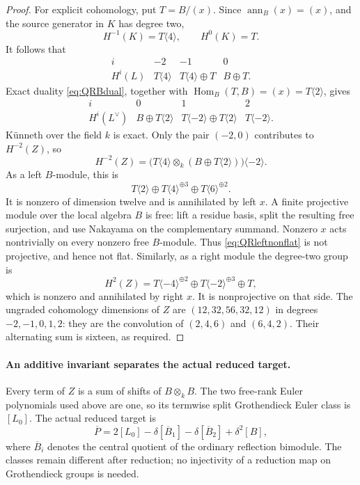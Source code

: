 \documentclass[11pt,a4paper]{article}
\theoremstyle{named}\newtheorem{finding}{Finding}[section]
\theoremstyle{definition}\newtheorem{definition}[finding]{Definition}
\theoremstyle{remark}\newtheorem{remark}[finding]{Remark}
\begin{document}
\begin{proof}
For explicit cohomology, put \(T=B/(x)\).
Since \(\operatorname{ann}_B(x)=(x)\), and the
source generator in \(K\) has degree two,
\[
 H^{-1}(K)=T\langle4\rangle,\qquad H^0(K)=T.
\]
It follows that
\[
\begin{array}{c|ccc}
 i&-2&-1&0\\\hline
 H^i(L)&T\langle4\rangle&
 T\langle4\rangle\oplus T&B\oplus T.
\end{array}
\]
Exact duality \eqref{eq:QRBdual}, together with
\(\operatorname{Hom}_B(T,B)=(x)=T\langle2\rangle\),
gives
\[
\begin{array}{c|ccc}
 i&0&1&2\\\hline
 H^i(L^\vee)&B\oplus T\langle2\rangle&
 T\langle-2\rangle\oplus T\langle2\rangle&
 T\langle-2\rangle.
\end{array}
\]
K\"unneth over the field \(k\) is exact.
Only the pair \((-2,0)\) contributes to
\(H^{-2}(Z)\), so
\[
 H^{-2}(Z)=
 \bigl(T\langle4\rangle\otimes_k
       (B\oplus T\langle2\rangle)\bigr)\langle-2\rangle.
\]
As a left \(B\)-module, this is
\begin{equation}\label{eq:QRleftnonflat}
 T\langle2\rangle\oplus
 T\langle4\rangle^{\oplus3}\oplus
 T\langle6\rangle^{\oplus2}.
\end{equation}
It is nonzero of dimension twelve and is annihilated
by left \(x\). A finite projective module over the
local algebra \(B\) is free: lift a residue basis,
split the resulting free surjection, and use
Nakayama on the complementary summand.
Nonzero \(x\) acts nontrivially on every nonzero
free \(B\)-module. Thus \eqref{eq:QRleftnonflat}
is not projective, and hence not flat.
Similarly, as a right module the degree-two group is
\begin{equation}\label{eq:QRrightnonflat}
 H^2(Z)=T\langle-4\rangle^{\oplus2}\oplus
        T\langle-2\rangle^{\oplus3}\oplus T,
\end{equation}
which is nonzero and annihilated by right \(x\).
It is nonprojective on that side.
The ungraded cohomology dimensions of \(Z\) are
\((12,32,56,32,12)\) in degrees \(-2,-1,0,1,2\):
they are the convolution of \((2,4,6)\) and
\((6,4,2)\). Their alternating sum is sixteen,
as required.
\end{proof}

\paragraph{An additive invariant separates the actual reduced target.}
Every term of \(Z\) is a sum of shifts of
\(B\otimes_k B\). The two free-rank Euler
polynomials used above are one, so its termwise
split Grothendieck Euler class is \([L_0]\).
The actual reduced target is
\begin{equation}\label{eq:QRtarget}
 \overline P=2[L_0]-\delta[\overline B_1]
                    -\delta[\overline B_2]+\delta^2[B],
\end{equation}
where \(\overline B_i\) denotes the central quotient
of the ordinary reflection bimodule. The classes
remain different after reduction; no injectivity
of a reduction map on Grothendieck groups is needed.
\end{document}
